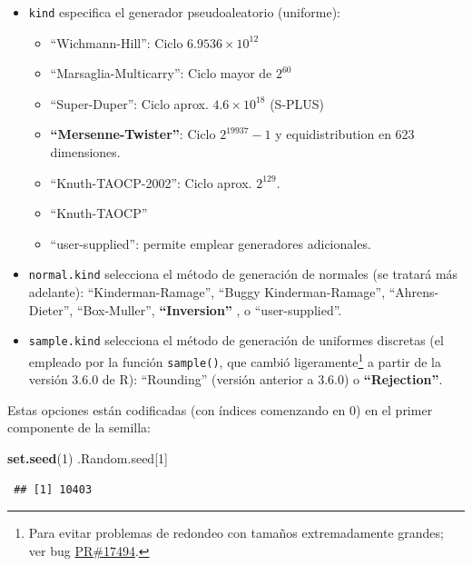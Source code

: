 \documentclass[
  spanish,
  10pt,
]{book}
\newenvironment{Shaded}{\begin{snugshade}}{\end{snugshade}}
\newcommand{\DecValTok}[1]{\textcolor[rgb]{0.00,0.00,0.81}{#1}}
\newcommand{\FunctionTok}[1]{\textcolor[rgb]{0.13,0.29,0.53}{\textbf{#1}}}
\newcommand{\NormalTok}[1]{#1}
\theoremstyle{break}
\theoremstyle{nonumberplain}
\let\oldfootnote\footnote
\renewcommand\footnote[1]{\oldfootnote{\hspace{2mm}#1}}
\begin{document}
\begin{itemize}
\item
  \texttt{kind} especifica el generador pseudoaleatorio (uniforme):

  \begin{itemize}
  \item
    ``Wichmann-Hill'': Ciclo \(6.9536\times10^{12}\)
  \item
    ``Marsaglia-Multicarry'': Ciclo mayor de \(2^{60}\)
  \item
    ``Super-Duper'': Ciclo aprox. \(4.6\times10^{18}\) (S-PLUS)
  \item
    \textbf{``Mersenne-Twister''}: Ciclo \(2^{19937}-1\) y equidistribution
    en 623 dimensiones.
  \item
    ``Knuth-TAOCP-2002'': Ciclo aprox. \(2^{129}\).
  \item
    ``Knuth-TAOCP''
  \item
    ``user-supplied'': permite emplear generadores adicionales.
  \end{itemize}
\item
  \texttt{normal.kind} selecciona el método de generación de normales
  (se tratará más adelante):
  ``Kinderman-Ramage'', ``Buggy Kinderman-Ramage'',
  ``Ahrens-Dieter'', ``Box-Muller'', \textbf{``Inversion''} , o ``user-supplied''.
\item
  \texttt{sample.kind} selecciona el método de generación de uniformes discretas (el empleado por la función \texttt{sample()}, que cambió ligeramente\footnote{Para evitar problemas de redondeo con tamaños extremadamente grandes; ver bug \href{https://bugs.r-project.org/bugzilla3/show_bug.cgi?id=17494}{PR\#17494}.} a partir de la versión 3.6.0 de R): ``Rounding'' (versión anterior a 3.6.0) o \textbf{``Rejection''}.
\end{itemize}

Estas opciones están codificadas (con índices comenzando en 0) en el primer componente de la semilla:

\begin{Shaded}
\begin{Highlighting}[]
\FunctionTok{set.seed}\NormalTok{(}\DecValTok{1}\NormalTok{)}
\NormalTok{.Random.seed[}\DecValTok{1}\NormalTok{]}
\end{Highlighting}
\end{Shaded}

\begin{verbatim}
 ## [1] 10403
\end{verbatim}
\end{document}
